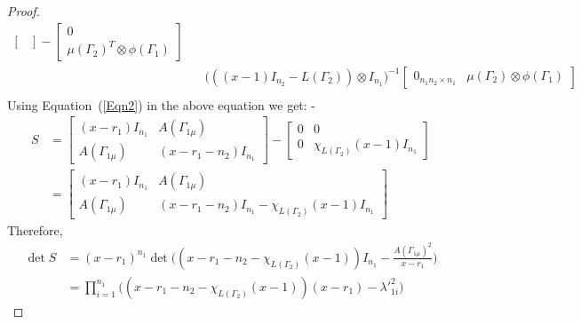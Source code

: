 \documentclass[12pt,a4paper]{article}
\theoremstyle{definition}
\theoremstyle{remark}
\begin{document}
\begin{proof}
\begin{equation*}
\begin{split}
\begin{bmatrix}
                \end{bmatrix}-\begin{bmatrix}
                    0\\
                    \mu(\Gamma_2)^T\otimes\phi(\Gamma_1)
                \end{bmatrix} \\ &~~~~\big(((x-1)I_{n_2}-L(\Gamma_2))\otimes I_{n_1}\big)^{-1} \begin{bmatrix}
                    0_{n_1n_2\times n_1}& \mu(\Gamma_2)\otimes\phi(\Gamma_1)
                \end{bmatrix}\\
            \end{split}
        \end{equation*}
        Using Equation~(\ref{Eqn2}) in the above equation we get: -\\
        \begin{equation*}
            \begin{split}
                S&=\begin{bmatrix}
                    (x-r_1)I_{n_1}& A(\Gamma_{1\mu})\\
                    A(\Gamma_{1\mu})& (x-r_1-n_2)I_{n_1}
                \end{bmatrix}-\begin{bmatrix}
                    0& 0\\
                    0& \chi_{L(\Gamma_2)}(x-1)I_{n_1}
                \end{bmatrix}\\
                &=\begin{bmatrix}
                    (x-r_1)I_{n_1}& A(\Gamma_{1\mu})\\
                    A(\Gamma_{1\mu})& (x-r_1-n_2)I_{n_1}-\chi_{L(\Gamma_2)}(x-1)I_{n_1}
                \end{bmatrix}
            \end{split}
        \end{equation*}
        Therefore,
        \begin{equation*}
            \begin{split}
                \det S&=(x-r_1)^{n_1}\det\Big((x-r_1-n_2-\chi_{L(\Gamma_2)}(x-1))I_{n_1}-\frac{A(\Gamma_{1\mu})^2}{x-r_1}\Big)\\
                &=\prod_{i=1}^{n_1}\big((x-r_1-n_2-\chi_{L(\Gamma_2)}(x-1))(x-r_1)-{\lambda'}_{1i}^2\big)
            \end{split}
        \end{equation*}

\end{proof}
\end{document}
